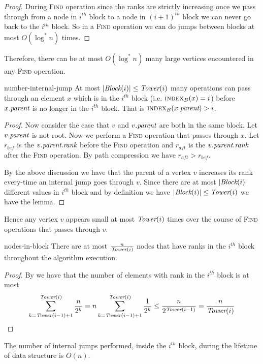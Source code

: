 \begin{proof}
	During \textsc{Find} operation since the ranks are strictly increasing once we pass through from a node in $i^{th}$ block to a node in $(i+1)^{th}$ block we can never go back to the $i^{th}$ block. So in a \textsc{Find} operation we can do jumps between blocks at most $O(\log^* n)$ times.
\end{proof}
Therefore, there can be at most $O(\log^*n)$ many large vertices encountered in any \textsc{Find} operation.
\begin{lemma}{}{number-internal-jump}
	At most $|\emph{Block}(i)|\leq \emph{Tower}(i)$ many  operations can pass through an element $x$ which is in the $i^{th}$ block (i.e. $\textsc{index}_B(x)=i$) before $x.\emph{parent}$ is no longer in the $i^{th}$ block. That is $\textsc{index}_B(x.\emph{parent})>i$.
\end{lemma}
\begin{proof}
	Now consider the case that $v$ and $v.\emph{parent}$ are both in the same block. Let $v.\emph{parent}$ is not root. Now we perform a \textsc{Find} operation that passes through $x$. Let $r_{bef}$ is the $v.\emph{parent}.\emph{rank}$ before the \textsc{Find} operation and $r_{aft}$ is the $v.\emph{parent}.\emph{rank}$ after the \textsc{Find} operation. By path compression we have $r_{aft}>r_{bef}$.

	By the above discussion we have that the parent of a vertex $v$ increases its rank every-time an internal jump goes through $v$. Since there are at most $|\emph{Block}(i)|$ different values in $i^{th}$ block and by definition we have $|\emph{Block}(i)|\leq \emph{Tower}(i)$  we have the lemma.
\end{proof}
Hence any vertex $v$ appears small at most $\emph{Tower}(i)$ times over the course of \textsc{Find} operations that passes through $v$.
\begin{lemma}{}{nodes-in-block}
	There are at most $\frac{n}{\emph{Tower}(i)}$ nodes that have ranks in the $i^{th}$ block throughout the algorithm execution.
\end{lemma}
\begin{proof}
	By  we have that the number of elements with rank in the $i^{th}$ block is at most $$\sum\limits_{k=\emph{Tower}(i-1)+1}^{\emph{Tower}(i)}\frac{n}{2^k}=n\sum\limits_{k=\emph{Tower}(i-1)+1}^{\emph{Tower}(i)}\frac1{2^k}\leq \frac{n}{2^{\emph{Tower}(i-1)}}=\frac{n}{\emph{Tower}(i)}$$
\end{proof}
\begin{lemma}{}{}
	The number of internal jumps performed, inside the $i^{th}$ block, during the lifetime of  data structure is $O(n)$.
\end{lemma}
